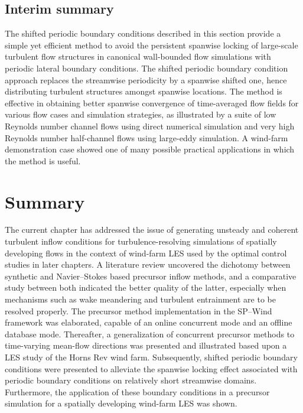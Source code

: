 	
	\subsection{Interim summary}
	The shifted periodic boundary conditions described in this section provide a simple yet efficient method to avoid the persistent spanwise locking of large-scale turbulent flow structures in canonical wall-bounded flow simulations with periodic lateral boundary conditions. The shifted periodic boundary condition approach replaces the streamwise periodicity by a spanwise shifted one, hence distributing turbulent structures amongst spanwise locations. The method is effective in obtaining better spanwise convergence of time-averaged flow fields for various flow cases and simulation strategies, as illustrated by a suite of low Reynolds number channel flows using direct numerical simulation and very high Reynolds number half-channel flows using large-eddy simulation. A wind-farm demonstration case showed one of many possible practical applications in which the method is useful.

	
\section{Summary}\label{sec:inflow_summary}
The current chapter has addressed the issue of generating unsteady and coherent turbulent inflow conditions for turbulence-resolving simulations of spatially developing flows in the context of wind-farm LES used by the optimal control studies in later chapters. A literature review uncovered the dichotomy between synthetic and Navier--Stokes based precursor inflow methods, and a comparative study between both indicated the better quality of the latter, especially when mechanisms such as wake meandering and turbulent entrainment are to be resolved properly. The precursor method implementation in the SP--Wind framework was elaborated, capable of an online concurrent mode and an offline database mode. Thereafter, a generalization of concurrent precursor methods to time-varying mean-flow directions was presented and illustrated based upon a LES study of the Horns Rev wind farm. Subsequently, shifted periodic boundary conditions were presented to alleviate the spanwise locking effect associated with periodic boundary conditions on relatively short streamwise domains. Furthermore, the application of these boundary conditions in a precursor simulation for a spatially developing wind-farm LES was shown. 

\cleardoublepage
